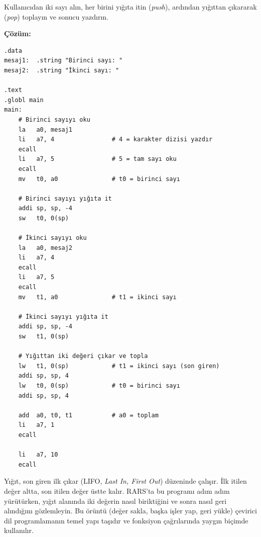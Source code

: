 \begin{ornek}[4.4]
\label{orn:yigit-toplama}
Kullanıcıdan iki sayı alın, her birini yığıta itin (\emph{push}), ardından yığıttan çıkararak (\emph{pop}) toplayın ve sonucu yazdırın.

\textbf{Çözüm:}

\begin{lstlisting}[style=riscv]
.data
mesaj1:  .string "Birinci sayı: "
mesaj2:  .string "İkinci sayı: "

.text
.globl main
main:
    # Birinci sayıyı oku
    la   a0, mesaj1
    li   a7, 4                # 4 = karakter dizisi yazdır
    ecall
    li   a7, 5                # 5 = tam sayı oku
    ecall
    mv   t0, a0               # t0 = birinci sayı

    # Birinci sayıyı yığıta it
    addi sp, sp, -4
    sw   t0, 0(sp)

    # İkinci sayıyı oku
    la   a0, mesaj2
    li   a7, 4
    ecall
    li   a7, 5
    ecall
    mv   t1, a0               # t1 = ikinci sayı

    # İkinci sayıyı yığıta it
    addi sp, sp, -4
    sw   t1, 0(sp)

    # Yığıttan iki değeri çıkar ve topla
    lw   t1, 0(sp)            # t1 = ikinci sayı (son giren)
    addi sp, sp, 4
    lw   t0, 0(sp)            # t0 = birinci sayı
    addi sp, sp, 4

    add  a0, t0, t1           # a0 = toplam
    li   a7, 1
    ecall

    li   a7, 10
    ecall
\end{lstlisting}

Yığıt, son giren ilk çıkar (LIFO, \emph{Last In, First Out}) düzeninde çalışır. İlk itilen değer altta, son itilen değer üstte kalır. RARS'ta bu programı adım adım yürütürken, yığıt alanında iki değerin nasıl biriktiğini ve sonra nasıl geri alındığını gözlemleyin. Bu örüntü (değer sakla, başka işler yap, geri yükle) çevirici dil programlamanın temel yapı taşıdır ve fonksiyon çağrılarında yaygın biçimde kullanılır.


\end{ornek}
